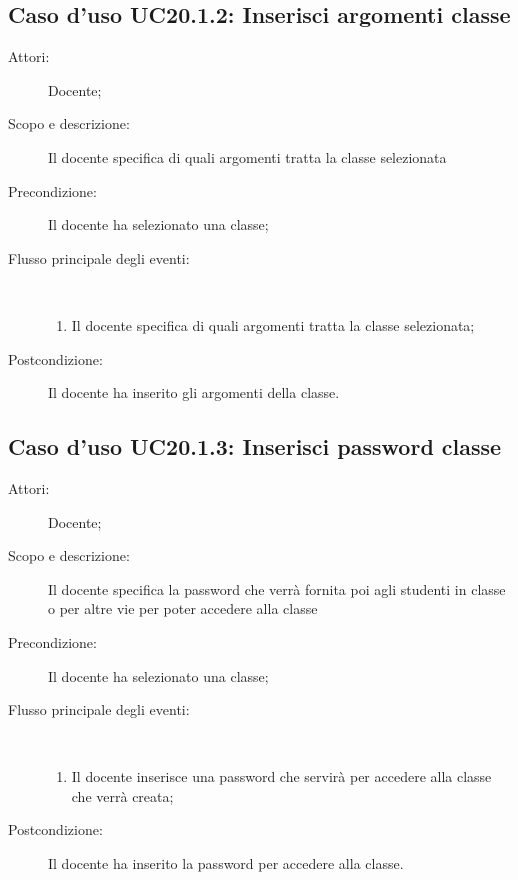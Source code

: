 \subsection{Caso d'uso UC20.1.2: Inserisci argomenti classe}\begin{description}
\item[Attori:] Docente;
\item[Scopo e descrizione:] Il docente specifica di quali argomenti tratta la classe selezionata
      \item[Precondizione:] Il docente ha selezionato una classe;

        \item[Flusso principale degli eventi:] \ 
 \begin{enumerate}
          \item Il docente specifica di quali argomenti tratta la classe selezionata;

      \end{enumerate}
    \item[Postcondizione:] Il docente ha inserito gli argomenti della classe.
  \end{description}
\hypertarget{UC20.1.3}{}
\subsection{Caso d'uso UC20.1.3: Inserisci password classe}\begin{description}
\item[Attori:] Docente;
\item[Scopo e descrizione:] Il docente specifica la password che verrà fornita poi agli studenti in classe o per altre vie per poter accedere alla classe
      \item[Precondizione:] Il docente ha selezionato una classe;

        \item[Flusso principale degli eventi:] \ 
 \begin{enumerate}
          \item Il docente inserisce una password che servirà per accedere alla classe che verrà creata;

      \end{enumerate}
    \item[Postcondizione:] Il docente ha inserito la password per accedere alla classe.
  \end{description}
\hypertarget{UC20.2}{}
